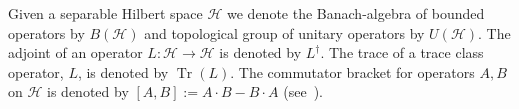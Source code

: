 \documentclass[final,leqno]{siamart}
\newcommand{\pder}[2]{\ensuremath{\frac{ \partial #1}{\partial #2}}}
\DeclareMathOperator{\Tr}{Tr}
\begin{document}
Given a separable Hilbert space $\mathcal{H}$ we denote the Banach-algebra of bounded operators by $B( \mathcal{H})$ and topological group of unitary operators by $U( \mathcal{H})$.
The adjoint of an operator $L : \mathcal{H} \to \mathcal{H}$ is denoted by $L^{\dagger}$.
The trace of a trace class operator, $L$, is denoted by $\Tr(L)$.
The commutator bracket for operators $A,B$ on $\mathcal{H}$ is denoted by $[A,B] := A \cdot B - B \cdot A$ (see~\cite{Conway1990}).

%
%
\end{document}
